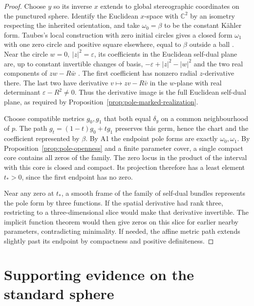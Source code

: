 \documentclass[11pt,letterpaper]{article}
\numberwithin{equation}{section}
\begin{document}
\begin{proof}
Choose \(y\) so its inverse \(x\) extends to global stereographic
coordinates on the punctured sphere. Identify the Euclidean \(x\)-space
with \(\mathbb C^2\) by an isometry respecting the inherited
orientation, and take \(\omega_0=\beta\) to be the constant K\"ahler
form. Taubes's local construction with zero initial circles gives a
closed form \(\omega_1\) with one zero circle and positive square
elsewhere, equal to \(\beta\) outside a ball
\cite[Proposition~2.1 and Part~5, following (2.16)]{Taubes2006VanishingCircles}.
Near the circle \(w=0,\ |z|^2=\varepsilon\), its coefficients in
the Euclidean self-dual plane are, up to constant invertible changes
of basis, \(-\varepsilon+|z|^2-|w|^2\) and the two real components
of \(zw-R\bar w\)
\cite[(2.2)--(2.5)]{Taubes2006VanishingCircles}.
The first coefficient has nonzero radial \(z\)-derivative there. The
last two have derivative \(v\mapsto zv-R\bar v\) in the \(w\)-plane
with real determinant \(\varepsilon-R^2\ne0\). Thus the derivative
image is the full Euclidean self-dual plane, as required by
Proposition~\ref{prop:pole-marked-realization}.

Choose compatible metrics \(g_0,g_1\) that both equal \(\delta_y\)
on a common neighbourhood of \(p\). The path
\(g_t=(1-t)g_0+tg_1\) preserves this germ, hence the chart and the
coefficient represented by \(\beta\). By A1 the endpoint pole forms
are exactly \(\omega_0,\omega_1\). By Proposition~\ref{prop:pole-openness}
and a finite parameter cover, a single compact core contains all zeros
of the family. The zero locus in the product of the interval with
this core is closed and compact. Its projection therefore has a
least element \(t_*>0\), since the first endpoint has no zero.

Near any zero at \(t_*\), a smooth frame of the family of self-dual
bundles represents the pole form by three functions. If the spatial
derivative had rank three, restricting to a three-dimensional slice
would make that derivative invertible. The implicit function theorem
would then give zeros on this slice for earlier nearby parameters,
contradicting minimality. If needed, the affine metric path extends
slightly past its endpoint by compactness and positive definiteness.
\end{proof}

\section{Supporting evidence on the standard sphere}
\label{sec:evidence}
\end{document}
